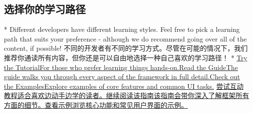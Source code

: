 \begin{paracol}{2}
\subsection{选择你的学习路径}
\switchcolumn[0]*%
Different developers have different learning styles. Feel free to pick a
learning path that suits your preference - although we do recommend
going over all of the content, if possible!
\switchcolumn
不同的开发者有不同的学习方式。尽管在可能的情况下，我们推荐你通读所有内容，但你还是可以自由地选择一种自己喜欢的学习路径！
\switchcolumn[0]*%
\href{https://vuejs.org/tutorial/}{Try the TutorialFor those who prefer
learning things
hands-on.}\href{https://vuejs.org/guide/quick-start}{Read the GuideThe
guide walks you through every aspect of the framework in full
detail.}\href{https://vuejs.org/examples/}{Check out the ExamplesExplore
examples of core features and common UI tasks.}
\switchcolumn
\href{https://cn.vuejs.org/tutorial/}{尝试互动教程适合喜欢边动手边学的读者。}\href{https://cn.vuejs.org/guide/quick-start.html}{继续阅读该指南该指南会带你深入了解框架所有方面的细节。}\href{https://cn.vuejs.org/examples/}{查看示例浏览核心功能和常见用户界面的示例。}
\end{paracol}



